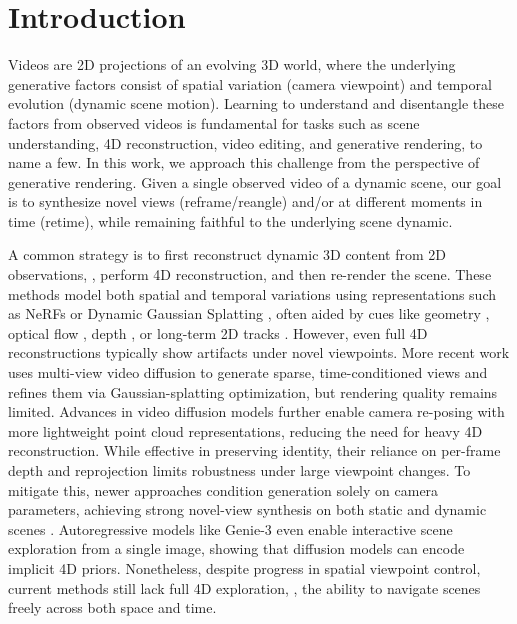 \documentclass[10pt,twocolumn,letterpaper]{article}
\begin{document}
    

\section{Introduction}
\label{sec:intro}

Videos are 2D projections of an evolving 3D world, where the underlying generative factors consist of spatial variation (camera viewpoint) and temporal evolution (dynamic scene motion). Learning to understand and disentangle these factors from observed videos is fundamental for tasks such as scene understanding, 4D reconstruction, video editing, and generative rendering, to name a few.  In this work, we approach this challenge from the perspective of generative rendering. Given a single observed video of a dynamic scene, our goal is to synthesize novel views (reframe/reangle) and/or at different moments in time (retime), while remaining faithful to the underlying scene dynamic. 

A common strategy is to first reconstruct dynamic 3D content from 2D observations, \ie, perform 4D reconstruction, and then re-render the scene. 
These methods model both spatial and temporal variations using representations such as NeRFs \cite{lin2024dynamic,mildenhall2021nerf} or Dynamic Gaussian Splatting \cite{kerbl20233d,wu20244d}, often aided by cues like geometry \cite{park2021hypernerf,park2021nerfies}, optical flow \cite{li2023dynibar,li2021nsff}, depth \cite{gao2021dynamic,yoon2020novel}, or long-term 2D tracks \cite{wang2024shapeofmotion,lei2024mosca}. However, even full 4D reconstructions typically show artifacts under novel viewpoints.
More recent work \cite{Wu2024, liang2024diffusion4d} uses multi-view video diffusion to generate sparse, time-conditioned views and refines them via Gaussian-splatting optimization, but rendering quality remains limited.
Advances in video diffusion models \cite{zhang2024show, wang2024lavie, blattmann2023stable, jeong2024track4gen, bar2024lumiere, videoworldsimulators2024, yang2024cogvideox, polyak2024moviegencastmedia, kong2024hunyuanvideo} further enable camera re-posing with more lightweight point cloud representations, reducing the need for heavy 4D reconstruction. While effective in preserving identity, their reliance on per-frame depth and reprojection limits robustness under large viewpoint changes. To mitigate this, newer approaches condition generation solely on camera parameters, achieving strong novel-view synthesis on both static \cite{jin2025lvsm} and dynamic scenes \cite{Bai2025,vanhoorick2024gcd,He2025}. 
Autoregressive models like Genie-3 \cite{parker-holder2025genie3} even enable interactive scene exploration from a single image, showing that diffusion models can encode implicit 4D priors. 
Nonetheless, despite progress in spatial viewpoint control, current methods still lack full 4D exploration, \ie, the ability to navigate scenes freely across both space and time.
\end{document}
